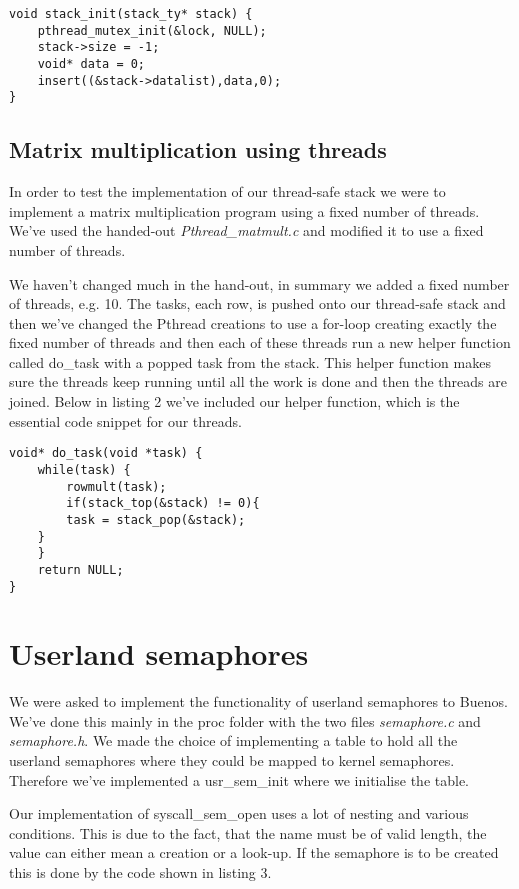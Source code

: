 \documentclass[12pt,a4paper,danish]{article}
\begin{document}
\begin{lstlisting}[caption=The stack\_init implementation]
void stack_init(stack_ty* stack) {
    pthread_mutex_init(&lock, NULL);
    stack->size = -1;
    void* data = 0;
    insert((&stack->datalist),data,0);
}
\end{lstlisting}
\subsection{Matrix multiplication using threads}
In order to test the implementation of our thread-safe stack we were to implement a matrix multiplication program using a fixed number of threads. We've used the handed-out \textit{Pthread\_matmult.c} and modified it to use a fixed number of threads.

We haven't changed much in the hand-out, in summary we added a fixed number of threads, e.g. 10. The tasks, each row, is pushed onto our thread-safe stack and then we've changed the Pthread creations to use a for-loop creating exactly the fixed number of threads and then each of these threads run a new helper function called do\_task with a popped task from the stack. This helper function makes sure the threads keep running until all the work is done and then the threads are joined. Below in listing 2 we've included our helper function, which is the essential code snippet for our threads.
\begin{lstlisting}[caption=The helper function do\_task]
void* do_task(void *task) {
    while(task) {
        rowmult(task);
        if(stack_top(&stack) != 0){
        task = stack_pop(&stack);
    }
    }
    return NULL;
}
\end{lstlisting}

\section{Userland semaphores}
We were asked to implement the functionality of userland semaphores to Buenos. We've done this mainly in the proc folder with the two files \textit{semaphore.c} and \textit{semaphore.h}. We made the choice of implementing a table to hold all the userland semaphores where they could be mapped to kernel semaphores. Therefore we've implemented a usr\_sem\_init where we initialise the table.

Our implementation of syscall\_sem\_open uses a lot of nesting and various conditions. This is due to the fact, that the name must be of valid length, the value can either mean a creation or a look-up. If the semaphore is to be created this is done by the code shown in listing 3.
\end{document}
